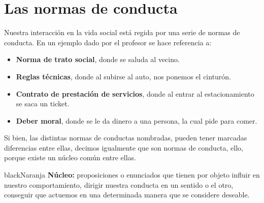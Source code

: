 \documentclass{templateApunte}
\begin{document}
\section{Las normas de conducta}
Nuestra interacción en la vida social está regida por una serie de normas de conducta.
En un ejemplo dado por el profesor se hace referencia a:
\begin{itemize}
  \item \textbf{Norma de trato social}, donde se saluda al vecino.
  \item \textbf{Reglas técnicas}, donde al subirse al auto, nos ponemos el cinturón.
  \item \textbf{Contrato de prestación de servicios}, donde al entrar al estacionamiento se saca un ticket.
  \item \textbf{Deber moral}, donde se le da dinero a una persona, la cual pide para comer.
\end{itemize}
Si bien, las distintas normas de conductas nombradas, pueden tener marcadas diferencias entre ellas, decimos igualmente que son normas de conducta, ello, porque existe un núcleo común entre ellas.
\begin{cPB}{black}{Naranja}
  \textbf{Núcleo:} proposiciones o enunciados que tienen por objeto influir en nuestro comportamiento, dirigir nuestra conducta en un sentido o el otro, conseguir que actuemos en una determinada manera que se considere deseable.  
\end{cPB}
\end{document}
